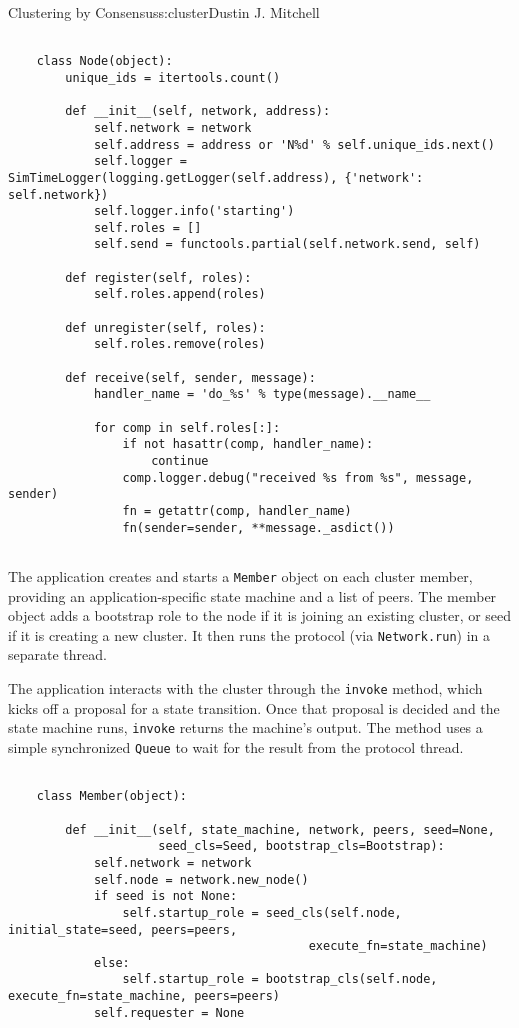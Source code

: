 \begin{aosachapter}{Clustering by Consensus}{s:cluster}{Dustin J. Mitchell}
\begin{verbatim}

    class Node(object):
        unique_ids = itertools.count()
    
        def __init__(self, network, address):
            self.network = network
            self.address = address or 'N%d' % self.unique_ids.next()
            self.logger = SimTimeLogger(logging.getLogger(self.address), {'network': self.network})
            self.logger.info('starting')
            self.roles = []
            self.send = functools.partial(self.network.send, self)
    
        def register(self, roles):
            self.roles.append(roles)
    
        def unregister(self, roles):
            self.roles.remove(roles)
    
        def receive(self, sender, message):
            handler_name = 'do_%s' % type(message).__name__
    
            for comp in self.roles[:]:
                if not hasattr(comp, handler_name):
                    continue
                comp.logger.debug("received %s from %s", message, sender)
                fn = getattr(comp, handler_name)
                fn(sender=sender, **message._asdict())
    
\end{verbatim}

\label{application-interface}

The application creates and starts a \texttt{Member} object on each
cluster member, providing an application-specific state machine and a
list of peers. The member object adds a bootstrap role to the node if it
is joining an existing cluster, or seed if it is creating a new cluster.
It then runs the protocol (via \texttt{Network.run}) in a separate
thread.

The application interacts with the cluster through the \texttt{invoke}
method, which kicks off a proposal for a state transition. Once that
proposal is decided and the state machine runs, \texttt{invoke} returns
the machine's output. The method uses a simple synchronized
\texttt{Queue} to wait for the result from the protocol thread.

\begin{verbatim}

    class Member(object):
    
        def __init__(self, state_machine, network, peers, seed=None,
                     seed_cls=Seed, bootstrap_cls=Bootstrap):
            self.network = network
            self.node = network.new_node()
            if seed is not None:
                self.startup_role = seed_cls(self.node, initial_state=seed, peers=peers,
                                          execute_fn=state_machine)
            else:
                self.startup_role = bootstrap_cls(self.node, execute_fn=state_machine, peers=peers)
            self.requester = None
    

\end{verbatim}
\end{aosachapter}
